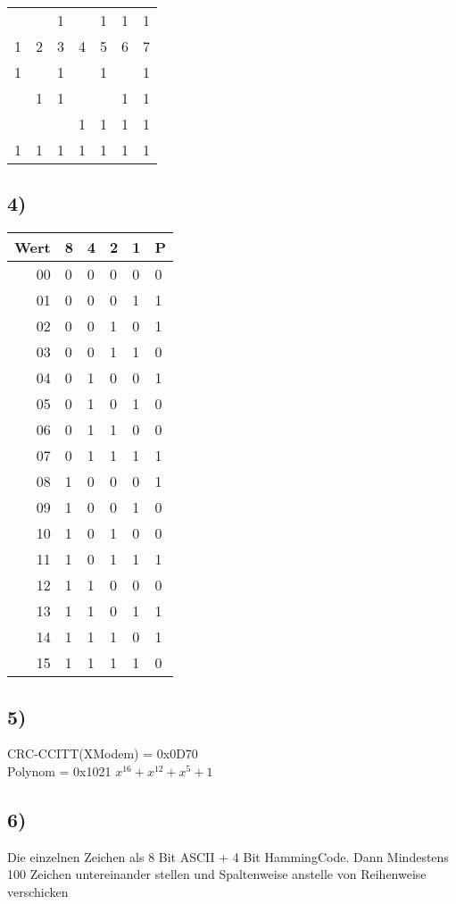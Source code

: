 \documentclass[]{article}
\begin{document}
\begin{longtable}[l]{@{}lllllll@{}}
	\toprule
	 & &1& &1&1&1\\
	1&2&3&4&5&6&7\\
	\endhead
	\midrule
	1& &1& &1& &1\\
	 &1&1& & &1&1\\
	 & & &1&1&1&1\\
	\hline
	1&1&1&1&1&1&1\\
	\bottomrule
\end{longtable}

\pagebreak

\subsection{4)}\label{Aufgabe 5}

\begin{longtable}[l]{@{}r|lllll@{}}
	\toprule
	Wert&8&4&2&1&P\\
	\endhead
	\midrule
	00&0&0&0&0&0\\
	01&0&0&0&1&1\\
	02&0&0&1&0&1\\
	03&0&0&1&1&0\\
	04&0&1&0&0&1\\
	05&0&1&0&1&0\\
	06&0&1&1&0&0\\
	07&0&1&1&1&1\\
	08&1&0&0&0&1\\
	09&1&0&0&1&0\\
	10&1&0&1&0&0\\
	11&1&0&1&1&1\\
	12&1&1&0&0&0\\
	13&1&1&0&1&1\\
	14&1&1&1&0&1\\
	15&1&1&1&1&0\\
	\bottomrule
\end{longtable}

\subsection{5)}\label{5}

CRC-CCITT(XModem) = 0x0D70\\
Polynom = 0x1021 $x^{16} + x^{12} + x^{5} + 1$

\subsection{6)}\label{6}

Die einzelnen Zeichen als 8 Bit ASCII + 4 Bit HammingCode. Dann Mindestens 100 Zeichen untereinander stellen und Spaltenweise
anstelle von Reihenweise verschicken
\end{document}
